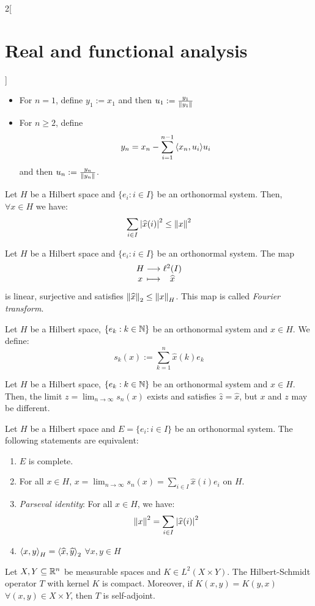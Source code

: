 \documentclass[../../../main_math.tex]{subfiles}
\begin{document}
\begin{multicols}{2}[\section{Real and functional analysis}]
\begin{proposition}
    \begin{itemize}
      \item For $n = 1$, define $y_1:=x_1$ and then $u_1:=\frac{y_1}{\left\|y_1\right\|}$
      \item For $n\geq 2$, define $$y_n=x_n-\sum_{i=1}^{n-1}{\left\langle x_n,u_i\right\rangle}u_i$$
            and then $u_n:=\frac{y_n}{\left\|y_n\right\|}$.
    \end{itemize}
  \end{proposition}
  \begin{theorem}
    Let $H$ be a Hilbert space and $\{e_i:i\in I\}$ be an orthonormal system. Then, $\forall x\in H$ we have: $$\sum_{i\in I}\abs{\widehat{x}(i)}^2\leq\left\|x\right\|^2$$
  \end{theorem}
  \begin{lemma}
    Let $H$ be a Hilbert space and $\{e_i:i\in I\}$ be an orthonormal system. The map $$\function{}{H}{\ell^2(I)}{x}{\widehat{x}}$$ is linear, surjective and satisfies $\left\|\widehat{x}\right\|_2\leq\left\|x\right\|_H$. This map is called \emph{Fourier transform}.
  \end{lemma}
  \begin{definition}
    Let $H$ be a Hilbert space, $\{e_k:k\in\mathbb{N}\}$ be an orthonormal system and $x\in H$. We define: $$s_k(x):=\sum_{k=1}^n\widehat{x}(k)e_k$$
  \end{definition}
  \begin{lemma}
    Let $H$ be a Hilbert space, $\{e_k:k\in\mathbb{N}\}$ be an orthonormal system and $x\in H$. Then, the limit $\displaystyle z = \lim_{n\to\infty} s_n(x)$ exists and satisfies $\widehat{z}=\widehat{x}$, but $x$ and $z$ may be different.
  \end{lemma}
  \begin{theorem}
    Let $H$ be a Hilbert space and $E=\{e_i:i\in I\}$ be an orthonormal system. The following statements are equivalent:
    \begin{enumerate}
      \item $E$ is complete.
      \item For all $x\in H$, $\displaystyle x=\lim_{n\to\infty} s_n(x)=\sum_{i\in I} \widehat{x}(i)e_i$ on $H$.
      \item \emph{Parseval identity}: For all $x\in H$, we have: $$\left\|x\right\|^2=\sum_{i\in I}\abs{\widehat{x}(i)}^2$$
      \item ${\left\langle x,y\right\rangle}_H={\left\langle\widehat{x},\widehat{y}\right\rangle}_2$ $\forall x,y\in H$
    \end{enumerate}
  \end{theorem}
  \begin{proposition}
    Let $X,Y\subseteq \mathbb{R}^n$ be measurable spaces and $K\in L^2(X\times Y)$. The Hilbert-Schmidt operator $T$ with kernel $K$ is compact. Moreover, if $K(x,y)=K(y,x)$ $\forall (x,y)\in X\times Y$, then $T$ is self-adjoint.
  \end{proposition}

\end{multicols}
\end{document}
